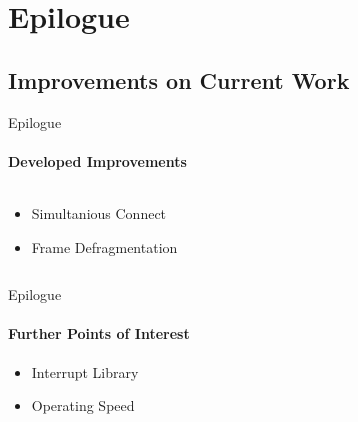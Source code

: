 \section{Epilogue}
    \subsection{Improvements on Current Work}
        \begin{frame}[t]{Epilogue}\framesubtitle{Developed Improvements}
            \begin{columns}[T]
                \begin{column}{0.48\textwidth}
                    \begin{itemize}
                        \item Simultanious Connect
                        \item Frame Defragmentation
                    \end{itemize}
                \end{column}
                \begin{column}{.48\textwidth}
                    \begin{figure}
                    \end{figure}
                \end{column}
            \end{columns}
        \end{frame}
        \begin{frame}[t]{Epilogue}\framesubtitle{Further Points of Interest}
            \begin{itemize}
                \item Interrupt Library
                \item Operating Speed
            \end{itemize}
        \end{frame}

